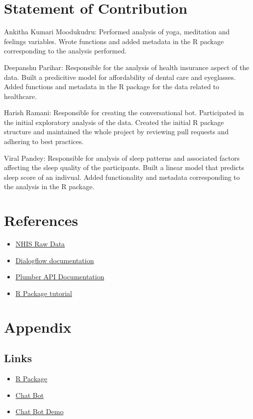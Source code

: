 \documentclass[12pt]{article}
\begin{document}
\section{Statement of Contribution}
Ankitha Kumari Moodukudru: Performed analysis of yoga, meditation and feelings variables. Wrote functions and added metadata in the R package corresponding to the analysis performed. 

Deepanshu Parihar: Responsible for the analysis of health insurance aspect of the data. Built a predicitive model for affordability of dental care and eyeglasses. Added functions and metadata in the R package for the data related to healthcare.

Harish Ramani: Responsible for creating the conversational bot. Participated in the initial exploratory analysis of the data. Created the initial R package structure and maintained the whole project by reviewing pull requests and adhering to best practices.

Viral Pandey: Responsible for analysis of sleep patterns and associated factors affecting the sleep quality of the participants. Built a linear model that predicts sleep score of an indivual. Added functionality and metadata corresponding to the analysis in the R package.

\section{References}
\begin{itemize}
\item \href{https://www.cdc.gov/nchs/nhis/index.htm}{NHIS Raw Data}
\item \href{https://dialogflow.com/docs}{Dialogflow documentation}
\item \href{https://www.rplumber.io/docs/}{Plumber API Documentation}
\item \href{https://hilaryparker.com/2014/04/29/writing-an-r-package-from-scratch/}{R Package tutorial}

\end{itemize}


\newpage

\section{Appendix}
\subsection{Links}
\begin{itemize}
\item \href{https://github.com/mancunian1792/nhis5110}{R Package}
\item \href{https://github.com/mancunian1792/nhis_chatbot}{Chat Bot}
\item \href{https://www.youtube.com/watch?v=zpw6n1dUXuQ&feature=youtu.be}{Chat Bot Demo}


\end{itemize}
\end{document}
